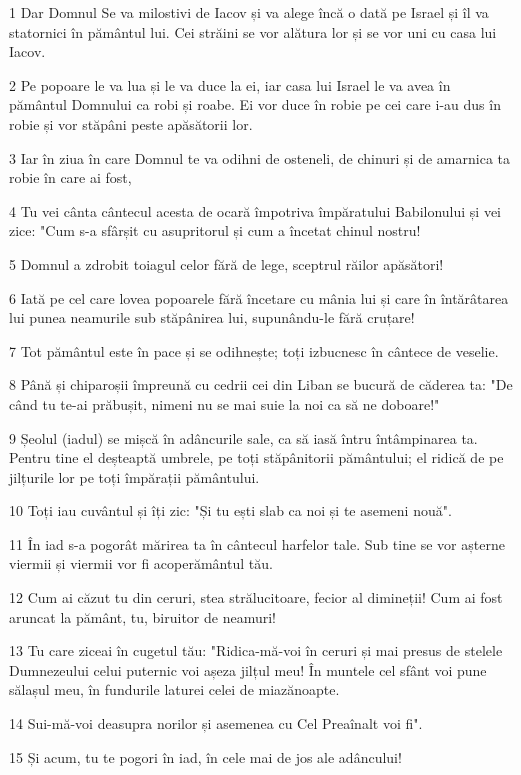 \par 1 Dar Domnul Se va milostivi de Iacov și va alege încă o dată pe Israel și îl va statornici în pământul lui. Cei străini se vor alătura lor și se vor uni cu casa lui Iacov.
\par 2 Pe popoare le va lua și le va duce la ei, iar casa lui Israel le va avea în pământul Domnului ca robi și roabe. Ei vor duce în robie pe cei care i-au dus în robie și vor stăpâni peste apăsătorii lor.
\par 3 Iar în ziua în care Domnul te va odihni de osteneli, de chinuri și de amarnica ta robie în care ai fost,
\par 4 Tu vei cânta cântecul acesta de ocară împotriva împăratului Babilonului și vei zice: "Cum s-a sfârșit cu asupritorul și cum a încetat chinul nostru!
\par 5 Domnul a zdrobit toiagul celor fără de lege, sceptrul răilor apăsători!
\par 6 Iată pe cel care lovea popoarele fără încetare cu mânia lui și care în întărâtarea lui punea neamurile sub stăpânirea lui, supunându-le fără cruțare!
\par 7 Tot pământul este în pace și se odihnește; toți izbucnesc în cântece de veselie.
\par 8 Până și chiparoșii împreună cu cedrii cei din Liban se bucură de căderea ta: "De când tu te-ai prăbușit, nimeni nu se mai suie la noi ca să ne doboare!"
\par 9 Șeolul (iadul) se mișcă în adâncurile sale, ca să iasă întru întâmpinarea ta. Pentru tine el deșteaptă umbrele, pe toți stăpânitorii pământului; el ridică de pe jilțurile lor pe toți împărații pământului.
\par 10 Toți iau cuvântul și îți zic: "Și tu ești slab ca noi și te asemeni nouă".
\par 11 În iad s-a pogorât mărirea ta în cântecul harfelor tale. Sub tine se vor așterne viermii și viermii vor fi acoperământul tău.
\par 12 Cum ai căzut tu din ceruri, stea strălucitoare, fecior al dimineții! Cum ai fost aruncat la pământ, tu, biruitor de neamuri!
\par 13 Tu care ziceai în cugetul tău: "Ridica-mă-voi în ceruri și mai presus de stelele Dumnezeului celui puternic voi așeza jilțul meu! În muntele cel sfânt voi pune sălașul meu, în fundurile laturei celei de miazănoapte.
\par 14 Sui-mă-voi deasupra norilor și asemenea cu Cel Preaînalt voi fi".
\par 15 Și acum, tu te pogori în iad, în cele mai de jos ale adâncului!
